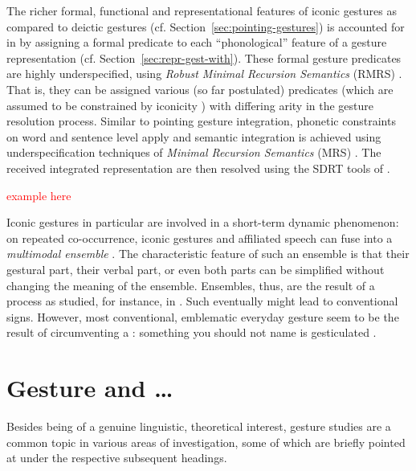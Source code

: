 \documentclass[output=paper]{langsci/langscibook}
\begin{document}
The richer formal, functional and representational features of iconic gestures as compared to deictic gestures (cf. Section~\ref{sec:pointing-gestures}) is accounted for in \citet{Alahverdzhieva:Lascarides:2010} by assigning a formal predicate to each \enquote{phonological} feature of a gesture representation (cf. Section~\ref{sec:repr-gest-with}). 
%
These formal gesture predicates are highly underspecified, using \textit{Robust Minimal Recursion Semantics} (RMRS) \citep{Copestake:2007}.
%
That is, they can be assigned various (so far postulated) predicates (which are assumed to be constrained by iconicity \citep{Alahverdzhieva:Lascarides:2010}) with differing arity in the gesture resolution process.
%
Similar to pointing gesture integration, phonetic constraints on word and sentence level apply and semantic integration is achieved using underspecification techniques of \textit{Minimal Recursion Semantics} (MRS) \citep{Copestake:Flickinger:Pollard:Sag:2005}.
%
The received integrated representation are then resolved using the SDRT tools of \citet{Lascarides:Stone:2009:a}.

\textcolor{red}{example here}


Iconic gestures in particular are involved in a short-term dynamic phenomenon:
%
on repeated co-occurrence, iconic gestures and affiliated speech can fuse into a \emph{multimodal ensemble} \citep{Kendon:2004,Luecking:Mehler:Menke:2008,Mehler:Luecking:2012:d}.  
%
The characteristic feature of such an ensemble is that their gestural part, their verbal part, or even both parts can be simplified without changing the meaning of the ensemble.
%
Ensembles, thus, are the result of a process  as studied, for instance, in  \citet{Galantucci:Garrod:2011}.
%
Such  eventually might lead to conventional signs.
%
However, most conventional, emblematic everyday gesture seem to be the result of circumventing a : something you should not name is gesticulated \citep{Posner:2002}. 
 



\section{Gesture and \ldots}
\label{sec:gesture-and}

Besides being of a genuine linguistic, theoretical interest, gesture studies are a common topic in various areas of investigation, some of which are briefly pointed at under the respective subsequent headings. 
\end{document}
